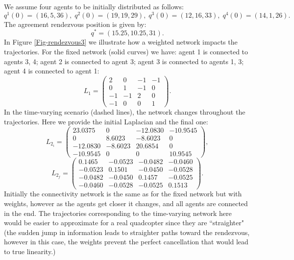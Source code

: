 \documentclass{aims}
\theoremstyle{definition}
\begin{document}
We assume four agents to be initially distributed as follows:
\begin{equation*}
    q^1(0)=(16,5,36)      ,\;q^2(0)=(19,19,29),\; q^3(0)=(12,16,33),\;q^4(0)=(14,1,26).
\end{equation*}
The agreement rendezvous position is given by:
\begin{equation}
    q^*=(15.25,10.25,31).
\end{equation}
In Figure \ref{Fig-rendezvous3} we illustrate how a weighted network impacts the trajectories. For the fixed network (solid curves) we have: agent 1 is connected to agents 3, 4; agent 2 is connected to agent 3; agent 3 is connected to agents 1, 3; agent 4 is connected to agent 1:
\begin{equation}
    L_1=\left(\begin{array}{cccc}2&0&-1&-1\\0&1&-1&0\\-1&-1&2&0\\-1&0&0&1\end{array}\right).
\end{equation}
In the time-varying scenario (dashed lines), the network changes throughout the trajectories. Here we provide the initial Laplacian and the final one:
\begin{equation}
    L_{2_i}=\left(\begin{array}{cccc}23.0375&0&-12.0830&-10.9545\\0&8.6023&-8.6023&0\\-12.0830&-8.6023&20.6854&0\\-10.9545&0&0&10.9545\end{array}\right),
    \end{equation}
\begin{equation}
    L_{2_f}=\left(\begin{array}{cccc}0.1465&-0.0523&-0.0482&-0.0460\\-0.0523&0.1501&-0.0450&-0.0528\\-0.0482&-0.0450&0.1457&-0.0525\\-0.0460&-0.0528&-0.0525&0.1513\end{array}\right).
\end{equation}
Initially the connectivity network is the same as for the fixed network but with weights, however as the agents get closer it changes, and all agents are connected in the end. The trajectories corresponding to the time-varying network here would be easier to approximate for a real quadcopter since they are ``straighter" (the sudden jump in information leads to straighter paths toward the rendezvous, however in this case, the weights prevent the perfect cancellation that would lead to true linearity.) 
\end{document}
